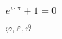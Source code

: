 \documentclass[12pt, a4paper]{article}
\begin{document}
$e ^{i\cdot\pi} + 1 = 0$


$\varphi, \varepsilon, \vartheta$
\end{document}
